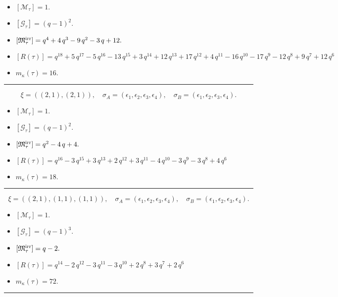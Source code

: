 \documentclass[10pt,a4paper]{amsart}
\begin{document}
\begin{itemize}
 \item $[\mathcal{M}_{\tau}] = 1 .$

 \item $[\mathcal{G}_{\tau}] = {\left(q - 1\right)}^{2} .$

 \item $[{\frak M}_{\tau}^{\textrm{irr}}] = q^{4} + 4 \, q^{3} - 9 \, q^{2} - 3 \, q + 12 .$

 \item $[R(\tau)] = q^{18} + 5 \, q^{17} - 5 \, q^{16} - 13 \, q^{15} + 3 \, q^{14} + 12 \, q^{13} + 17 \, q^{12} + 4 \, q^{11} - 16 \, q^{10} - 17 \, q^{9} - 12 \, q^{8} + 9 \, q^{7} + 12 \, q^{6} $

 \item $m_{\kappa}(\tau) = 16 .$

 \end{itemize}
\noindent\rule{8cm}{0.4pt}

$$\xi = ({(2, 1), (2, 1)}),\quad \sigma_A = ({{\epsilon_1, \epsilon_2}, {\epsilon_3, \epsilon_4}}),\quad \sigma_B = ({{\epsilon_1, \epsilon_2}, {\epsilon_3, \epsilon_4}}).$$

\begin{itemize}
 \item $[\mathcal{M}_{\tau}] = 1 .$

 \item $[\mathcal{G}_{\tau}] = {\left(q - 1\right)}^{2} .$

 \item $[{\frak M}_{\tau}^{\textrm{irr}}] = q^{2} - 4 \, q + 4 .$

 \item $[R(\tau)] = q^{16} - 3 \, q^{15} + 3 \, q^{13} + 2 \, q^{12} + 3 \, q^{11} - 4 \, q^{10} - 3 \, q^{9} - 3 \, q^{8} + 4 \, q^{6} $

 \item $m_{\kappa}(\tau) = 18 .$

 \end{itemize}
\noindent\rule{8cm}{0.4pt}

$$\xi = ({(2, 1), (1, 1), (1, 1)}),\quad \sigma_A = ({{\epsilon_1, \epsilon_2}, {\epsilon_3}, {\epsilon_4}}),\quad \sigma_B = ({{\epsilon_1, \epsilon_2}, {\epsilon_3}, {\epsilon_4}}).$$

\begin{itemize}
 \item $[\mathcal{M}_{\tau}] = 1 .$

 \item $[\mathcal{G}_{\tau}] = {\left(q - 1\right)}^{3} .$

 \item $[{\frak M}_{\tau}^{\textrm{irr}}] = q - 2 .$

 \item $[R(\tau)] = q^{14} - 2 \, q^{12} - 3 \, q^{11} - 3 \, q^{10} + 2 \, q^{8} + 3 \, q^{7} + 2 \, q^{6} $

 \item $m_{\kappa}(\tau) = 72 .$

 \end{itemize}
\noindent\rule{8cm}{0.4pt}
\end{document}
